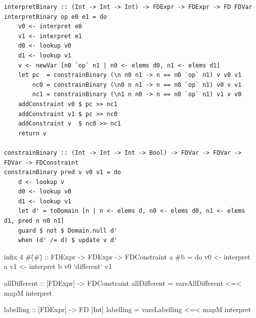 \documentclass[aspectratio=169,hyphens]{beamer} %
\begin{document}
\begin{frame}[fragile]
    \begin{verbatim}
interpretBinary :: (Int -> Int -> Int) -> FDExpr -> FDExpr -> FD FDVar
interpretBinary op e0 e1 = do
    v0 <- interpret e0
    v1 <- interpret e1
    d0 <- lookup v0
    d1 <- lookup v1
    v <- newVar [n0 `op` n1 | n0 <- elems d0, n1 <- elems d1]
    let pc  = constrainBinary (\n n0 n1 -> n == n0 `op` n1) v v0 v1
        nc0 = constrainBinary (\n0 n n1 -> n == n0 `op` n1) v0 v v1
        nc1 = constrainBinary (\n1 n n0 -> n == n0 `op` n1) v1 v v0
    addConstraint v0 $ pc >> nc1
    addConstraint v1 $ pc >> nc0
    addConstraint v  $ nc0 >> nc1
    return v

constrainBinary :: (Int -> Int -> Int -> Bool) -> FDVar -> FDVar -> FDVar -> FDConstraint
constrainBinary pred v v0 v1 = do
    d <- lookup v
    d0 <- lookup v0
    d1 <- lookup v1
    let d' = toDomain [n | n <- elems d, n0 <- elems d0, n1 <- elems d1, pred n n0 n1]
    guard $ not $ Domain.null d'
    when (d' /= d) $ update v d'
    \end{verbatim}
\end{frame}

\begin{frame}[fragile]
    \begin{code}
infix 4 #\=
(#\=) :: FDExpr -> FDExpr -> FDConstraint
a #\= b = do
    v0 <- interpret a
    v1 <- interpret b
    v0 `different` v1

allDifferent :: [FDExpr] -> FDConstraint
allDifferent = varsAllDifferent <=< mapM interpret

labelling :: [FDExpr] -> FD [Int]
labelling = varsLabelling <=< mapM interpret
    \end{code}
\end{frame}
\end{document}

